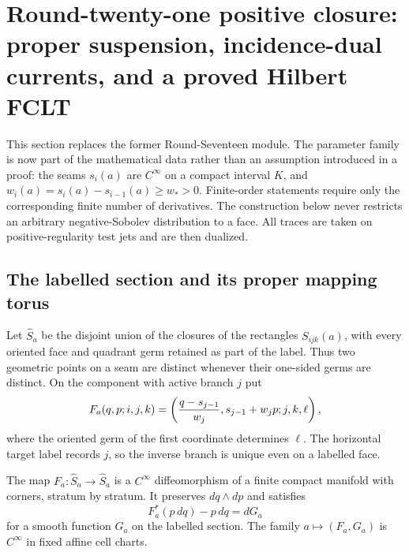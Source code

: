 \section{Round-twenty-one positive closure: proper suspension, incidence-dual currents, and a proved Hilbert FCLT}
\label{sec:r21-a1}

This section replaces the former Round-Seventeen module.  The parameter family
is now part of the mathematical data rather than an assumption introduced in
a proof: the seams $s_i(a)$ are $C^\infty$ on a compact interval $K$, and
$w_i(a)=s_i(a)-s_{i-1}(a)\ge w_*>0$.  Finite-order statements require only the
corresponding finite number of derivatives.  The construction below never
restricts an arbitrary negative-Sobolev distribution to a face.  All traces
are taken on positive-regularity test jets and are then dualized.

\subsection{The labelled section and its proper mapping torus}

Let $\widehat S_a$ be the disjoint union of the closures of the rectangles
$S_{ijk}(a)$, with every oriented face and quadrant germ retained as part of
the label.  Thus two geometric points on a seam are distinct whenever their
one-sided germs are distinct.  On the component with active branch $j$ put
\[
 F_a(q,p;i,j,k)=\left({q-s_{j-1}\over w_j},
 s_{j-1}+w_jp; j,k,\ell\right),
\]
where the oriented germ of the first coordinate determines $\ell$.  The
horizontal target label records $j$, so the inverse branch is unique even on
a labelled face.

\begin{lemma}
\label{lem:r21-a1-labelled}
The map $F_a:\widehat S_a\to\widehat S_a$ is a $C^\infty$ diffeomorphism of a
finite compact manifold with corners, stratum by stratum.  It preserves
$dq\wedge dp$ and satisfies
\[
 F_a^*(p\,dq)-p\,dq=dG_a
\]
for a smooth function $G_a$ on the labelled section.  The family
$a\mapsto(F_a,G_a)$ is $C^\infty$ in fixed affine cell charts.
\end{lemma}

